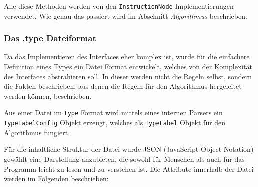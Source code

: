 Alle diese Methoden werden von den \texttt{InstructionNode} Implementierungen 
verwendet. Wie genau das passiert wird im Abschnitt \textit{Algorithmus} beschrieben.

\subsubsection{Das .type Dateiformat}

Da das Implementieren des Interfaces eher komplex ist, wurde für die einfachere 
Definition eines Types ein Datei Format entwickelt, welches von der Komplexität des
Interfaces abstrahieren soll. In dieser werden nicht die Regeln selbst, sondern 
die Fakten beschrieben, aus denen die Regeln für den Algorithmus hergeleitet werden 
können, beschrieben.

Aus einer Datei im \texttt{type} Format wird mittels eines internen Parsers ein
\texttt{TypeLabelConfig} Objekt erzeugt, welches als \texttt{TypeLabel} Objekt für
den Algorithmus fungiert.

Für die inhaltliche Struktur der Datei wurde JSON (JavaScript Object Notation) 
gewählt eine Darstellung anzubieten, die sowohl für Menschen als auch für das 
Programm leicht zu lesen und zu verstehen ist. Die Attribute innerhalb der Datei 
werden im Folgenden beschrieben:

